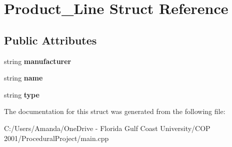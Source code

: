 \hypertarget{struct_product___line}{}\section{Product\+\_\+\+Line Struct Reference}
\label{struct_product___line}
\subsection*{Public Attributes}
\begin{DoxyCompactItemize}
\item 
\mbox{\label{struct_product___line_a0c80f45022ad66af2d53eba184171523}} 
string {\bfseries manufacturer}
\item 
\mbox{\label{struct_product___line_ac0ba1e0093e67720a51fb7c239b58801}} 
string {\bfseries name}
\item 
\mbox{\label{struct_product___line_a0e078ec4e8c44bab612d6b0a1889be41}} 
string {\bfseries type}
\end{DoxyCompactItemize}


The documentation for this struct was generated from the following file\+:\begin{DoxyCompactItemize}
\item 
C\+:/\+Users/\+Amanda/\+One\+Drive -\/ Florida Gulf Coast University/\+C\+O\+P 2001/\+Procedural\+Project/main.\+cpp\end{DoxyCompactItemize}
